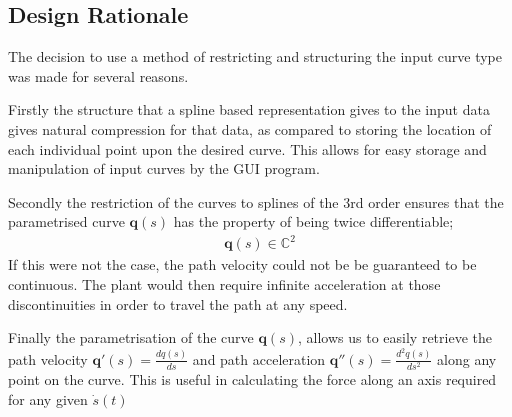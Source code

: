 \subsection{Design Rationale}


The decision to use a method of restricting and structuring the input curve type was made for several reasons. 

Firstly the structure that a spline based representation gives to the input data gives natural compression for that data, as compared to storing the location of each individual point upon the desired curve. This allows for easy storage and manipulation of input curves by the GUI program. 

Secondly the restriction of the curves to splines of the 3rd order ensures that the parametrised curve $\textbf{q}(s)$ has the property of being twice differentiable;
\begin{align*}
\textbf{q}(s) \in \mathbb{C}^2
\end{align*}
If this were not the case, the path velocity could not be be guaranteed to be continuous. The plant would then require infinite acceleration at those discontinuities in order to travel the path at any speed. 

Finally the parametrisation of the curve $\textbf{q}(s)$, allows us to easily retrieve the path velocity $\textbf{q}'(s) = \frac{dq(s)}{ds}$ and path acceleration $\textbf{q}''(s) =  \frac{d^2q(s)}{ds^2}$ along any point on the curve. This is useful in calculating the force along an axis required for any given $\dot{s}(t)$

